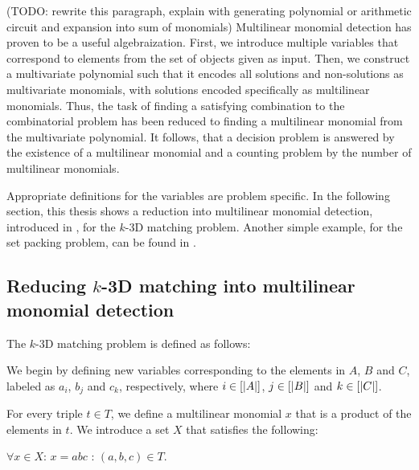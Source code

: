 (TODO: rewrite this paragraph, explain with generating polynomial or arithmetic circuit and expansion into sum of monomials)
Multilinear monomial detection has proven to be a useful algebraization. First, we introduce multiple variables that 
correspond to elements from the set of objects given as input. Then, we construct a multivariate polynomial such that it 
encodes all solutions and non-solutions as multivariate monomials, with solutions encoded specifically as multilinear monomials. 
Thus, the task of finding a satisfying combination to the combinatorial problem has been reduced to 
finding a multilinear monomial from the multivariate polynomial. It follows, that a decision problem is answered by 
the existence of a multilinear monomial and a counting problem by the number of multilinear monomials.\nl

Appropriate definitions for the variables are problem specific. In the following section, this thesis shows a 
reduction into multilinear monomial detection, introduced in \cite{KouWil15}, 
for the $k$-3D matching problem. Another simple example, for the set packing problem, can be found in \cite{Koutis05}.

\subsection{Reducing $k$-3D matching into multilinear monomial detection}

The $k$-3D matching problem is defined as follows:

\begin{problem}
\end{problem}

We begin by defining new variables corresponding to the elements in $A$, $B$ and $C$, 
labeled as $a_i$, $b_j$ and $c_k$, respectively, where $i\in [{\left\vert A\right\vert}]$, $j\in [{\left\vert B\right\vert}]$ and $k\in [{\left\vert C\right\vert}]$. 

For every triple $t \in T$, we define a multilinear monomial $x$ that is a product of the elements in $t$. 
We introduce a set $X$ that satisfies the following:
\begin{center}$\forall x \in X$: $x = abc$ : $(a, b, c) \in T$.\end{center}

